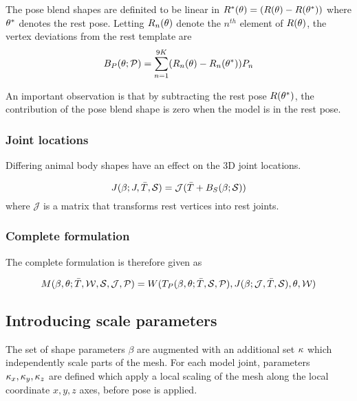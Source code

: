 The pose blend shapes are definited to be linear in $R^{*}(\theta) = (R(\theta) - R(\theta^{*}))$ where $\theta^{*}$ denotes the rest pose. Letting $R_{n}(\theta)$ denote the $n^{th}$ element of $R(\theta)$, the vertex deviations from the rest template are
\begin{equation}
    B_{P}(\theta;\mathcal{P}) = \sum_{n=1}^{9K} (R_{n}(\theta) - R_{n}(\theta^{*}))P_{n}
\end{equation}

An important observation is that by subtracting the rest pose $R(\theta^{*})$, the contribution of the pose blend shape is zero when the model is in the rest pose.


\subsubsection{Joint locations}

Differing animal body shapes have an effect on the 3D joint locations. 

\begin{equation}
    J(\beta; J, \bar{T}, \mathcal{S}) = \mathcal{J}(\bar{T} + B_{S}(\beta; \mathcal{S}))
\end{equation}
where $\mathcal{J}$ is a matrix that transforms rest vertices into rest joints.

\subsubsection{Complete formulation}

The complete formulation is therefore given as

\begin{equation}
    M(\beta,\theta;\bar{T},\mathcal{W},\mathcal{S},\mathcal{J},\mathcal{P}) = W(T_{P}(\beta,\theta; \bar{T},\mathcal{S},\mathcal{P}), J(\beta; \mathcal{J}, \bar{T}, \mathcal{S}), \theta, \mathcal{W})
\end{equation}


\subsection{Introducing scale parameters}

The set of shape parameters $\beta$ are augmented with an additional set $\kappa$ which independently scale parts of the mesh. For each model joint, parameters ${\kappa_x,\kappa_y,\kappa_z}$ are defined which apply a local scaling of the mesh along the local coordinate $x, y, z$ axes, before pose is applied. 

